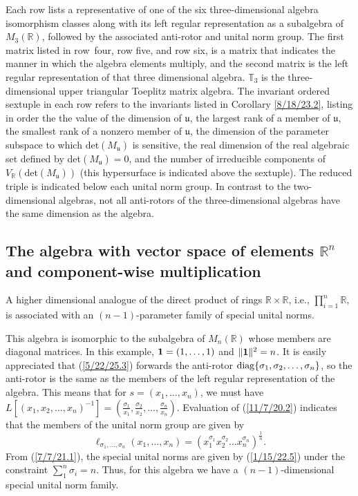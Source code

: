\documentclass{amsart}
\theoremstyle{definition}
\numberwithin{theorem}{section}
\numberwithin{equation}{section}
\begin{document}
 {\small   
Each row lists a representative  of one of the six three-dimensional algebra isomorphism classes along with its left regular representation as a subalgebra of $M_3(\mathbb{R})$, followed by the associated anti-rotor and unital norm group. The first matrix listed in \mbox{row four}, row five, and row six, is a matrix that indicates the manner in which the algebra elements multiply, and the second matrix is the left regular representation of that three dimensional algebra.  $\mathbb{T}_3$ is the three-dimensional upper triangular Toeplitz matrix algebra. The invariant ordered sextuple in each row refers to the invariants listed in Corollary \ref{8/18/23.2}, listing in order the the value of the dimension of $\mathfrak{u}$, the largest rank of a member of $\mathfrak{u}$, the smallest rank of a nonzero member of $\mathfrak{u}$, the dimension of the parameter subspace to which det$(M_{\mathfrak{u}})$ is sensitive, the real dimension of the real algebraic set defined by det$(M_{\mathfrak{u}}) =0$, and the number of irreducible components of $V_\mathbb{R}(\text{det}(M_{\mathfrak{u}}))$ (this hypersurface is indicated above the sextuple).  The reduced triple is indicated below each unital norm group.  In contrast to the two-dimensional algebras, not all anti-rotors of the three-dimensional algebras have the same dimension as the algebra.}
 

\vfill
\hspace{0pt}
\pagebreak



 \subsection{The algebra with vector space of elements $\mathbb{R}^n$ and component-wise multiplication} A higher dimensional analogue of the direct product of rings \mbox{$\mathbb{R}\times \mathbb{R}$}, i.e., $\prod_{i=1}^n \mathbb{R}$, is associated with an $(n-1)$-parameter family of  special unital norms.

 This algebra is isomorphic to the subalgebra of $ M_n(\mathbb{R})$  whose members are diagonal matrices. In this example, ${\bf 1} = (1,\dots,1)$ and $\|{\bf 1}\|^2 = n$.   It is easily appreciated that (\ref{5/22/25.3}) forwards the anti-rotor ${\rm diag} \{ \sigma_1, \sigma_2,\dots,\sigma_n\}$, so the anti-rotor is the same as the members of the left regular representation of the algebra.  This means that for $s=(x_1,\dots,x_n)$, we must have $L[(x_1,x_2,\dots,x_n)^{-1}] = (\frac{\sigma_1}{x_1}, \frac{\sigma_2}{x_2},\dots,\frac{\sigma_n}{x_n})$.     Evaluation of (\ref{11/7/20.2}) indicates that the members of the unital norm group are given by  \begin{equation}\label{1/15/22.5} \ell_{\sigma_1,\dots,\sigma_n}(x_1,\dots,x_n) = (x_1^{\sigma_1} x_2^{\sigma_2} \dots x_n^{\sigma_n})^\frac{1}{n}. \end{equation} From (\ref{7/7/21.1}), the special unital norms are given by (\ref{1/15/22.5}) under the constraint $\sum_1^n \sigma_i = n$. Thus, for this algebra we have a $(n-1)$-dimensional special unital norm family.   
 
\end{document}
